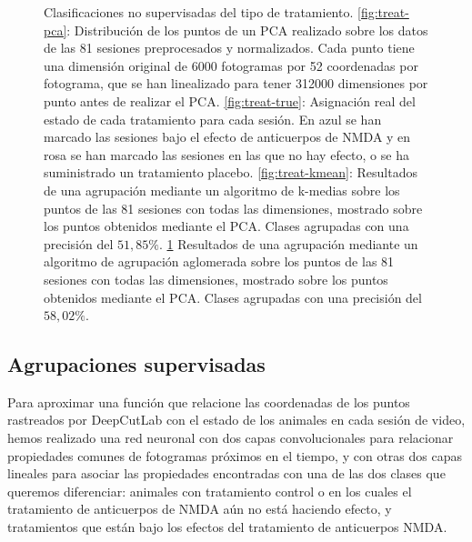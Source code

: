 \begin{figure}[p]
\begin{subfigure}{0.45\textwidth}
    \caption{}
    \label{fig:treat-agg}
  \end{subfigure}
  \caption[Clasificación no supervisada de tratamiento.]{Clasificaciones no supervisadas del tipo de tratamiento. \ref{fig:treat-pca}: Distribución de los puntos de un PCA realizado sobre los datos de las 81 sesiones preprocesados y normalizados. Cada punto tiene una dimensión original de 6000 fotogramas por 52 coordenadas por fotograma, que se han linealizado para tener 312000 dimensiones por punto antes de realizar el PCA. \ref{fig:treat-true}: Asignación real del estado de cada tratamiento para cada sesión. En azul se han marcado las sesiones bajo el efecto de anticuerpos de NMDA y en rosa se han marcado las sesiones en las que no hay efecto, o se ha suministrado un tratamiento placebo. \ref{fig:treat-kmean}: Resultados de una agrupación mediante un algoritmo de k-medias sobre los puntos de las 81 sesiones con todas las dimensiones, mostrado sobre los puntos obtenidos mediante el PCA. Clases agrupadas con una precisión del $ 51,85\% $. \ref{fig:treat-agg} Resultados de una agrupación mediante un algoritmo de agrupación aglomerada sobre los puntos de las 81 sesiones con todas las dimensiones, mostrado sobre los puntos obtenidos mediante el PCA. Clases agrupadas con una precisión del $ 58,02\% $.}
  \label{fig:unsupervied-treatment}
\end{figure}



\subsection{Agrupaciones supervisadas}

Para aproximar una función que relacione las coordenadas de los puntos rastreados por DeepCutLab con el estado de los animales en cada sesión de video, hemos realizado una red neuronal con dos capas convolucionales para relacionar propiedades comunes de fotogramas próximos en el tiempo, y con otras dos capas lineales para asociar las propiedades encontradas con una de las dos clases que queremos diferenciar: animales con tratamiento control o en los cuales el tratamiento de anticuerpos de NMDA aún no está haciendo efecto, y tratamientos que están bajo los efectos del tratamiento de anticuerpos NMDA.

